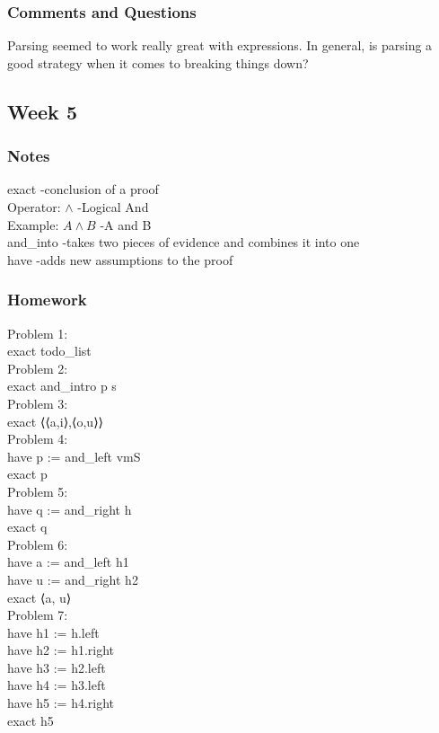 \documentclass{article}
\theoremstyle{theorem}
\theoremstyle{definition}
\theoremstyle{remark}
\begin{document}
\subsubsection*{Comments and Questions}
Parsing seemed to work really great with expressions. In general, is parsing a good strategy when it comes to breaking things down?

\subsection{Week 5}
\subsubsection*{Notes}
exact -conclusion of a proof\\
Operator: $\land$ -Logical And\\
Example: $A \land B$ -A and B\\
and\_into -takes two pieces of evidence and combines it into one\\
have -adds new assumptions to the proof\\

\subsubsection*{Homework}
Problem 1:\\
exact todo\_list\\

Problem 2:\\
exact and\_intro p s \\

Problem 3:\\
exact ⟨⟨a,i⟩,⟨o,u⟩⟩\\

Problem 4:\\
have p := and\_left vmS\\
exact p\\

Problem 5:\\
have q := and\_right h\\
exact q\\

Problem 6:\\
have a := and\_left h1\\
have u := and\_right h2\\
exact ⟨a, u⟩\\

Problem 7:\\
have h1 := h.left \\
have h2 := h1.right \\
have h3 := h2.left \\
have h4 := h3.left \\
have h5 := h4.right \\
exact h5 \\
\end{document}
